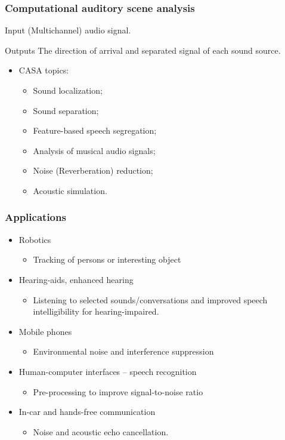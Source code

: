 \documentclass{beamer}
\begin{document}
\begin{frame}
\frametitle{Computational auditory scene analysis}
\begin{block}{Input}
  (Multichannel) audio signal.
\end{block}
\begin{block}{Outputs}
  The direction of arrival and separated signal of each sound source.
\end{block}
\begin{itemize}
  \item CASA topics:
  \begin{itemize}
    \item Sound localization;
    \item Sound separation;
    \item Feature-based speech segregation;
    \item Analysis of musical audio signals;
    \item Noise (Reverberation) reduction;
    \item Acoustic simulation.
  \end{itemize}
\end{itemize}
\end{frame}

\begin{frame}
\frametitle{Applications}
\begin{itemize}
  \item Robotics
  \begin{itemize}
    \item Tracking of persons or interesting object
  \end{itemize}
  \item Hearing-aids, enhanced hearing
  \begin{itemize}
    \item Listening to selected sounds/conversations and improved speech intelligibility for hearing-impaired.
  \end{itemize}
  \item Mobile phones
  \begin{itemize}
    \item Environmental noise and interference suppression
  \end{itemize}
  \item Human-computer interfaces – speech recognition
  \begin{itemize}
    \item Pre-processing to improve signal-to-noise ratio
  \end{itemize}
  \item In-car and hands-free communication
  \begin{itemize}
    \item Noise and acoustic echo cancellation.
  \end{itemize}
\end{itemize}
\end{frame}
\end{document}
